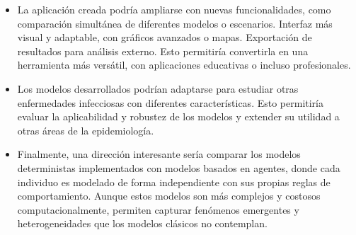 \begin{itemize}
    \item La aplicación creada podría ampliarse con nuevas funcionalidades, como comparación simultánea de diferentes modelos o escenarios. Interfaz más visual y adaptable, con gráficos avanzados o mapas. Exportación de resultados para análisis externo. Esto permitiría convertirla en una herramienta más versátil, con aplicaciones educativas o incluso profesionales.
    \item Los modelos desarrollados podrían adaptarse para estudiar otras enfermedades infecciosas con diferentes características. Esto permitiría evaluar la aplicabilidad y robustez de los modelos y extender su utilidad a otras áreas de la epidemiología.
    \item Finalmente, una dirección interesante sería comparar los modelos deterministas implementados con modelos basados en agentes, donde cada individuo es modelado de forma independiente con sus propias reglas de comportamiento. Aunque estos modelos son más complejos y costosos computacionalmente, permiten capturar fenómenos emergentes y heterogeneidades que los modelos clásicos no contemplan.
\end{itemize}